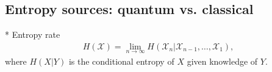 \documentclass[twocolumn, aps, amsmath, amssymb, nofootinbib, superscriptaddress, longbibliography, floatfix, eqsecnum, rmp]{revtex4-2}
\begin{document}
%
%
%
%

\subsection{Entropy sources: quantum vs. classical}

* Entropy rate
\begin{align}
	H(\mathcal{X}) = \lim_{n\to\infty} H(\mathcal{X}_n | \mathcal{X}_{n-1},\dots,\mathcal{X}_1),
\end{align}
where $H(X|Y)$ is the conditional entropy of $X$ given knowledge of $Y$.
\end{document}
